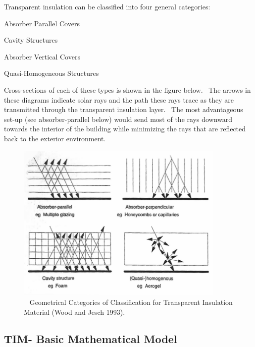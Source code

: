 Transparent insulation can be classified into four general categories:

Absorber Parallel Covers

Cavity Structures

Absorber Vertical Covers

Quasi-Homogeneous Structures

Cross-sections of each of these types is shown in the figure below.~ The arrows in these diagrams indicate solar rays and the path these rays trace as they are transmitted through the transparent insulation layer.~ The most advantageous set-up (see absorber-parallel below) would send most of the rays downward towards the interior of the building while minimizing the rays that are reflected back to the exterior environment.

\begin{figure}[hbtp] %
\centering
\includegraphics[width=0.9\textwidth, height=0.9\textheight, keepaspectratio=true]{media/image400.png}
\caption{  Geometrical Categories of Classification for Transparent Insulation Material (Wood and Jesch 1993). \protect \label{fig:geometrical-categories-of-classification-for}}
\end{figure}

\subsection{TIM- Basic Mathematical Model}\label{tim--basic-mathematical-model}

